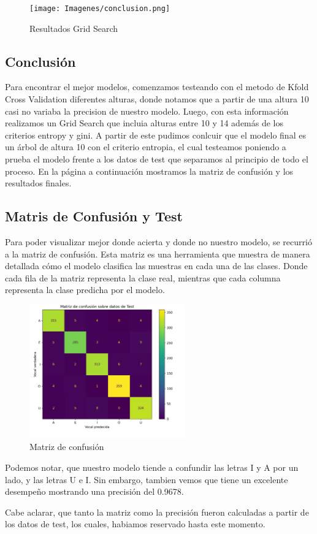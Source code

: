 \documentclass[10pt,a4paper]{article}
\begin{document}
\begin{figure}[h]
  \centering
  \texttt{[image: Imagenes/conclusion.png]}
  \caption{Resultados Grid Search}
  \label{fig:Tabla 1}
\end{figure}

\subsection{Conclusión}

Para encontrar el mejor modelos, comenzamos testeando con el metodo de Kfold Cross Validation diferentes alturas, donde notamos que a partir de una altura 10 casi no variaba la precision de nuestro modelo. Luego, con esta información realizamos un Grid Search que incluia alturas entre 10 y 14 además de los criterios entropy y gini. A partir de este pudimos conlcuir que el modelo final es un árbol de altura 10 con el criterio entropia, el cual testeamos poniendo a prueba el modelo frente a los datos de test que separamos al principio de todo el proceso. En la página a continuación mostramos la matriz de confusión y los resultados finales.

\newpage

\subsection{Matris de Confusión y Test}

Para poder visualizar mejor donde acierta y donde no nuestro modelo, se recurrió a la matriz de confusión. Esta matriz es una herramienta que muestra de manera detallada cómo el modelo clasifica las muestras en cada una de las clases. Donde cada fila de la matriz representa la clase real, mientras que cada columna representa la clase predicha por el modelo.

\begin{figure}[ht]
  \centering
  \includegraphics[width=0.6\textwidth]{Imagenes/matriz_confusion_arbol.png}
  \caption{Matriz de confusión}
  \label{fig:Tabla 1}
\end{figure}

Podemos notar, que nuestro modelo tiende a confundir las letras I y A por un lado, y las letras U e I. Sin embargo, tambien vemos que tiene un excelente desempeño mostrando una precisión del 0.9678.

Cabe aclarar, que tanto la matriz como la precisión fueron calculadas a partir de los datos de test, los cuales, habiamos reservado hasta este momento.
\end{document}
